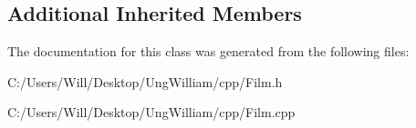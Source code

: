 \subsection*{Additional Inherited Members}


The documentation for this class was generated from the following files\+:\begin{DoxyCompactItemize}
\item 
C\+:/\+Users/\+Will/\+Desktop/\+Ung\+William/cpp/Film.\+h\item 
C\+:/\+Users/\+Will/\+Desktop/\+Ung\+William/cpp/Film.\+cpp\end{DoxyCompactItemize}
